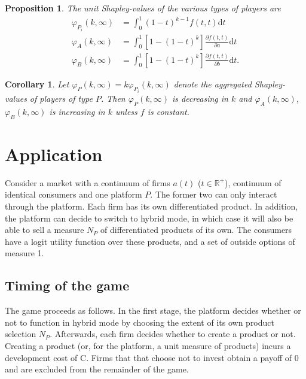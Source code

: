 \documentclass[a4paper]{article}
\newtheorem{proposition}{Proposition}
\newtheorem{corollary}{Corollary}
\newcommand{\dt}{\mathrm{d}t}
\begin{document}
\begin{proposition}
    The unit Shapley-values of the various types of players are
    \begin{align*}
        \varphi_{P_i}(k, \infty) & = \int_0^1 (1-t)^{k-1} f(t, t) \dt                                 \\
        \varphi_A(k, \infty)     & = \int_0^1 [1 - (1-t)^k] \frac{\partial f(t, t)}{\partial a} \dt   \\
        \varphi_B(k, \infty)     & = \int_0^1 [1 - (1-t)^k] \frac{\partial f(t, t)}{\partial b} \dt .
    \end{align*}
\end{proposition}

\begin{corollary}
    Let $\varphi_{P}(k, \infty) = k\varphi_{P_i}(k, \infty)$ denote the aggregated Shapley-values of players of type $P$. Then $\varphi_{P}(k, \infty)$ is decreasing in $k$ and $\varphi_{A}(k, \infty)$, $\varphi_{B}(k, \infty)$ is increasing in $k$ unless $f$ is constant.
\end{corollary}


\section{Application}

Consider a market with a continuum of firms $a(t)$ ($t \in \mathbb{R}^+$), continuum of identical consumers and one platform $P$. The former two can only interact through the platform. Each firm has its own differentiated product. In addition, the platform can decide to switch to hybrid mode, in which case it will also be able to sell a measure $N_P$ of differentiated products of its own. The consumers have a logit utility function over these products, and a set of outside options of measure 1.

\subsection{Timing of the game}

The game proceeds as follows. In the first stage, the platform decides whether or not to function in hybrid mode by choosing the extent of its own product selection $N_P$. Afterwards, each firm decides whether to create a product or not. Creating a product (or, for the platform, a unit measure of products) incurs a development cost of C. Firms that that choose not to invest obtain a payoff of 0 and are excluded from the remainder of the game.
\end{document}
